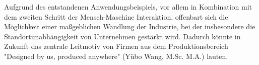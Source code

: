 \newline\newline
Aufgrund des entstandenen Anwendungsbeispiels, vor allem in Kombination mit dem zweiten Schritt der Mensch-Maschine Interaktion, offenbart sich die Möglichkeit einer maßgeblichen Wandlung der Industrie, bei der insbesondere die Standortunabhängigkeit von Unternehmen gestärkt wird. Dadurch könnte in Zukunft das zentrale Leitmotiv von Firmen aus dem Produktionsbereich "Designed by us, produced anywhere" (Yübo Wang, M.Sc. M.A.) lauten.
